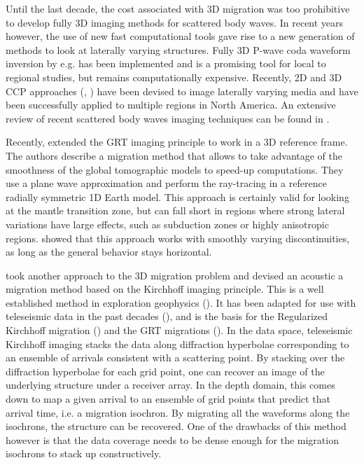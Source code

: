 \documentclass[10pt,a4paper]{article}
\numberwithin{equation}{section}
\begin{document}
Until the last decade, the cost associated with 3D migration was too prohibitive to develop fully 3D imaging methods for scattered body waves.
In recent years however, the use of new fast computational tools gave rise to a new generation of methods to look at laterally varying structures.
Fully 3D P-wave coda waveform inversion by e.g. \cite{fred_gji_04} has been implemented and is a promising tool for local to regional studies, but remains computationally expensive.
Recently, 2D and 3D CCP approaches (\cite{tauz_epsl_16}, \cite{rond_srl_17}) have been devised to image laterally varying media and have been successfully applied to multiple regions in North America.
An extensive review of recent scattered body waves imaging techniques can be found in \cite{rond_sgeo_09}.

Recently, \cite{pavl_cg_11} extended the GRT imaging principle to work in a 3D reference frame.
The authors describe a migration method that allows to take advantage of the smoothness of the global tomographic models to speed-up computations.
They use a plane wave approximation and perform the ray-tracing in a reference radially symmetric 1D Earth model.
This approach is certainly valid for looking at the mantle transition zone, but can fall short in regions where strong lateral variations have large effects, such as subduction zones or highly anisotropic regions.
\cite{wang_jgr_16} showed that this approach works with smoothly varying discontinuities, as long as the general behavior stays horizontal.

\cite{cheng_gji_16} took another approach to the 3D migration problem and devised an acoustic a migration method based on the Kirchhoff imaging principle.
This is a well established method in exploration geophysics (\cite{clae_book_85}).
It has been adapted for use with teleseismic data in the past decades (\cite{rybe_gji_00}), and is the basis for the Regularized Kirchhoff migration (\cite{wils_jgr_05}) and the GRT migrations (\cite{bost_jgr_01}).
In the data space, teleseismic Kirchhoff imaging stacks the data along diffraction hyperbolae corresponding to an ensemble of arrivals consistent with a scattering point.
By stacking over the diffraction hyperbolae for each grid point, one can recover an image of the underlying structure under a receiver array.
In the depth domain, this comes down to map a given arrival to an ensemble of grid points that predict that arrival time, i.e. a migration isochron.
By migrating all the waveforms along the isochrons, the structure can be recovered.
One of the drawbacks of this method however is that the data coverage needs to be dense enough for the migration isochrons to stack up constructively.
\end{document}
